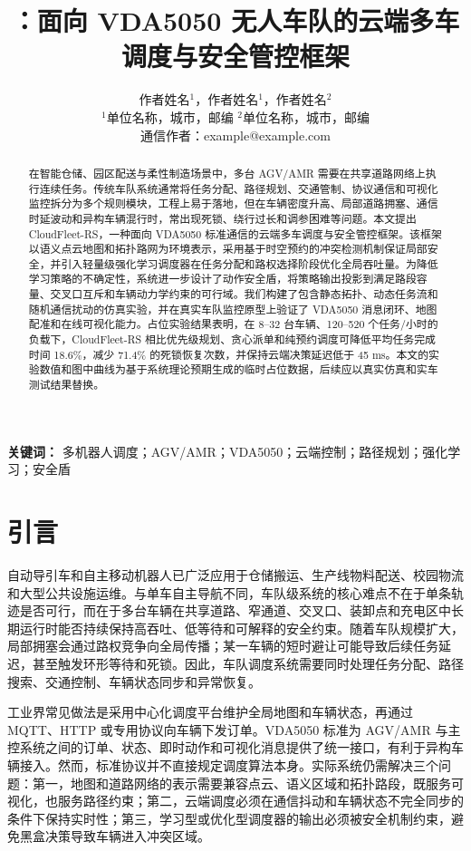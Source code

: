\documentclass[UTF8,twocolumn,11pt]{ctexart}
\title{\method{}：面向 VDA5050 无人车队的云端多车调度与安全管控框架}
\author{作者姓名$^{1}$，作者姓名$^{1}$，作者姓名$^{2}$\\
\small $^{1}$单位名称，城市，邮编 \quad $^{2}$单位名称，城市，邮编\\
\small 通信作者：example@example.com}
\date{}
\newcommand{\method}{CloudFleet-RS}
\begin{document}
\maketitle

\begin{abstract}
在智能仓储、园区配送与柔性制造场景中，多台 AGV/AMR 需要在共享道路网络上执行连续任务。传统车队系统通常将任务分配、路径规划、交通管制、协议通信和可视化监控拆分为多个规则模块，工程上易于落地，但在车辆密度升高、局部道路拥塞、通信时延波动和异构车辆混行时，常出现死锁、绕行过长和调参困难等问题。本文提出 \method{}，一种面向 VDA5050 标准通信的云端多车调度与安全管控框架。该框架以语义点云地图和拓扑路网为环境表示，采用基于时空预约的冲突检测机制保证局部安全，并引入轻量级强化学习调度器在任务分配和路权选择阶段优化全局吞吐量。为降低学习策略的不确定性，系统进一步设计了动作安全盾，将策略输出投影到满足路段容量、交叉口互斥和车辆动力学约束的可行域。我们构建了包含静态拓扑、动态任务流和随机通信扰动的仿真实验，并在真实车队监控原型上验证了 VDA5050 消息闭环、地图配准和在线可视化能力。占位实验结果表明，在 8--32 台车辆、120--520 个任务/小时的负载下，\method{} 相比优先级规划、贪心派单和纯预约调度可降低平均任务完成时间 18.6\%，减少 71.4\% 的死锁恢复次数，并保持云端决策延迟低于 45 ms。本文的实验数值和图中曲线为基于系统理论预期生成的临时占位数据，后续应以真实仿真和实车测试结果替换。
\end{abstract}

\noindent\textbf{关键词：} 多机器人调度；AGV/AMR；VDA5050；云端控制；路径规划；强化学习；安全盾

\section{引言}

自动导引车和自主移动机器人已广泛应用于仓储搬运、生产线物料配送、校园物流和大型公共设施运维。与单车自主导航不同，车队级系统的核心难点不在于单条轨迹是否可行，而在于多台车辆在共享道路、窄通道、交叉口、装卸点和充电区中长期运行时能否持续保持高吞吐、低等待和可解释的安全约束。随着车队规模扩大，局部拥塞会通过路权竞争向全局传播；某一车辆的短时避让可能导致后续任务延迟，甚至触发环形等待和死锁。因此，车队调度系统需要同时处理任务分配、路径搜索、交通控制、车辆状态同步和异常恢复。

工业界常见做法是采用中心化调度平台维护全局地图和车辆状态，再通过 MQTT、HTTP 或专用协议向车辆下发订单。VDA5050 标准为 AGV/AMR 与主控系统之间的订单、状态、即时动作和可视化消息提供了统一接口，有利于异构车辆接入。然而，标准协议并不直接规定调度算法本身。实际系统仍需解决三个问题：第一，地图和道路网络的表示需要兼容点云、语义区域和拓扑路段，既服务可视化，也服务路径约束；第二，云端调度必须在通信抖动和车辆状态不完全同步的条件下保持实时性；第三，学习型或优化型调度器的输出必须被安全机制约束，避免黑盒决策导致车辆进入冲突区域。
\end{document}
